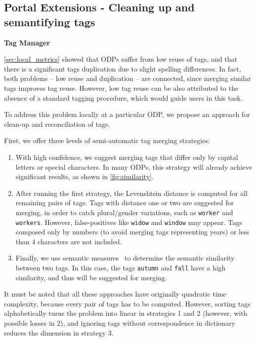 \subsection{Portal Extensions - Cleaning up and semantifying tags}
\label{sec:tag_manager_plugin}

\noindent\textbf{Tag Manager}

\autoref{sec:local_metrics} showed that ODPs suffer from low reuse of tags, and that there is a significant tags duplication due to slight spelling differences. 
In fact, both problems -- low reuse and duplication -- are connected, since merging similar tags improves tag reuse.
However, low tag reuse can be also attributed to the absence of a standard tagging procedure, which would guide users in this task.

To address this problem locally at a particular ODP, we propose an approach for clean-up and reconciliation of tags. %

First, we offer three levels of semi-automatic tag merging strategies:


\begin{enumerate}
	\item With high confidence, we suggest merging tags that differ only by capital letters or special characters. 
In many ODPs, this strategy will already achieve significant results, as shown in \autoref{fig:similarity}.
	\item After running the first strategy, the Levenshtein distance is computed for all remaining pairs of tags.
Tags with distance one or two are suggested for merging, in order to catch plural/gender variations, such as \texttt{worker} and \texttt{workers}. 
However, false-positives like \texttt{widow} and \texttt{window} may appear.
Tags composed only by numbers (to avoid merging tags representing years) or less than 4 characters are not included.
	\item Finally, we use semantic measures~\cite{Harispe01032014} to determine the semantic similarity between two tags. 
In this case, the tags \texttt{autumn} and \texttt{fall} have a high similarity, and thus will be suggested for merging.
\end{enumerate}

It must be noted that all these approaches have originally quadratic time complexity, because every pair of tags has to be computed. However, sorting tags alphabetically turns the problem into linear in strategies 1 and 2 (however, with possible losses in 2), and ignoring tags without correspondence in dictionary reduces the dimension in strategy 3.

